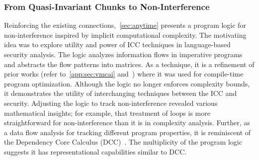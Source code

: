 \subsubsection{From Quasi-Invariant Chunks to Non-Interference}
\label{quasi-ni}

Reinforcing the existing connections,~\autoref{sec:anytime} presents a program logic for non-interference inspired by implicit computational complexity.
The motivating idea was to explore utility and power of ICC techniques in language-based security analysis.
The logic analyzes information flows in imperative programs and abstracts the flow patterns into matrices.
As a technique, it is a refinement of prior works (refer to~\autoref{app:sec:vmcai} and~\cite{moyen20172}) where it was used for compile-time program optimization.
Although the logic no longer enforces complexity bounds, it demonstrates the utility of interchanging techniques between the ICC and security.
Adjusting the logic to track {non-interference} revealed various mathematical insights;
for example, that treatment of loops is more straightforward for {non-interference} than it is in {complexity analysis}.
Further, as a data flow analysis for tracking different program properties, 
it is reminiscent of the {Dependency Core Calculus (DCC)}~\cite{abadi1999b}.
The multiplicity of the program logic suggests it has representational capabilities similar to DCC.
